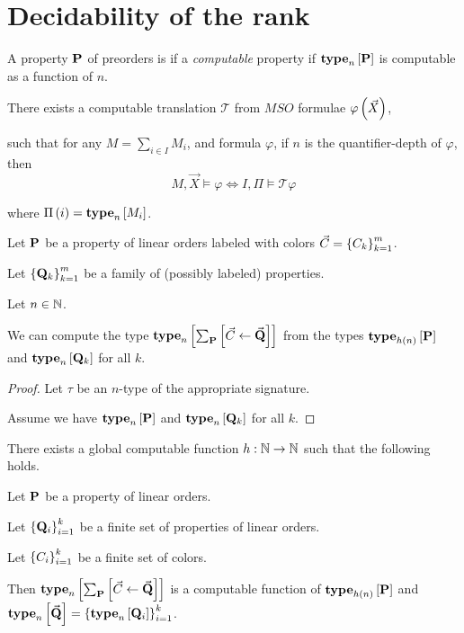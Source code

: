 \section{Decidability of the rank}
\begin{definition}
  A property $\mathbf{P}$ of preorders is if a
  \emph{computable} property if
  $\mathbf{type}_{n} \left[ {\mathbf{P}} \right]$ is computable as a function of $n$.
\end{definition}

\begin{theorem}
  There exists a computable translation $\mathcal{T}$
  from $MSO$ formulae $\varphi \left( {\vec{X}} \right)$,

  such that for any $M = \sum_{i \in I} M_i$, and formula $\varphi$,
  if $n$ is the quantifier-depth of $\varphi$,
  then
  \[
    M, \vec{X} \models \varphi \iff I, \Pi \models \mathcal{T} {\varphi}
  \]

  where $\Pi \left( {i} \right) = \mathbf{type}_{n} \left[ {M_i} \right]$.
\end{theorem}

\begin{corollary}
  Let $\mathbf{P}$ be a property of linear orders
  labeled with colors $\vec{C} = \left\{ {C_k} \right\}_{k=1}^m$.

  Let $\left\{ {\mathbf{Q}_k} \right\}_{k=1}^m$ be a family of (possibly labeled) properties.

  Let $n \in \mathbb{N}$.

  We can compute the type $\mathbf{type}_{n} \left[ {\sum_{\mathbf{P}} \left[ {{\vec{C}} \leftarrow {\vec{\mathbf{Q}}}} \right]} \right]$
  from the types $\mathbf{type}_{h(n)} \left[ {\mathbf{P}} \right]$ and $\mathbf{type}_{n} \left[ {\mathbf{Q}_k} \right]$ for all $k$.
\end{corollary}

\begin{proof}
  Let $\tau$ be an $n$-type of the appropriate signature.
  
  Assume we have $\mathbf{type}_{n} \left[ {\mathbf{P}} \right]$ and $\mathbf{type}_{n} \left[ {\mathbf{Q}_k} \right]$ for all $k$.
\end{proof}

\begin{lemma}
  There exists a global computable function
  $h : \mathbb{N} \to \mathbb{N}$ such that the following holds.

  Let $\mathbf{P}$ be a property of linear orders.

  Let $\left\{ {\mathbf{Q}_i} \right\}_{i=1}^k$ be a finite set of properties of linear orders.

  Let $\left\{ {C_i} \right\}_{i=1}^k$ be a finite set of colors.

  Then $\mathbf{type}_{n} \left[ {\sum_{\mathbf{P}} \left[ {{\vec{C}} \leftarrow {\vec{\mathbf{Q}}}} \right]} \right]$ is 
  a computable function of $\mathbf{type}_{h(n)} \left[ {\mathbf{P}} \right]$
  and $\mathbf{type}_{n} \left[ {\vec{\mathbf{Q}}} \right] = \left\{ {\mathbf{type}_{n} \left[ {\mathbf{Q}_i} \right]} \right\}_{i=1}^k$.
\end{lemma}

